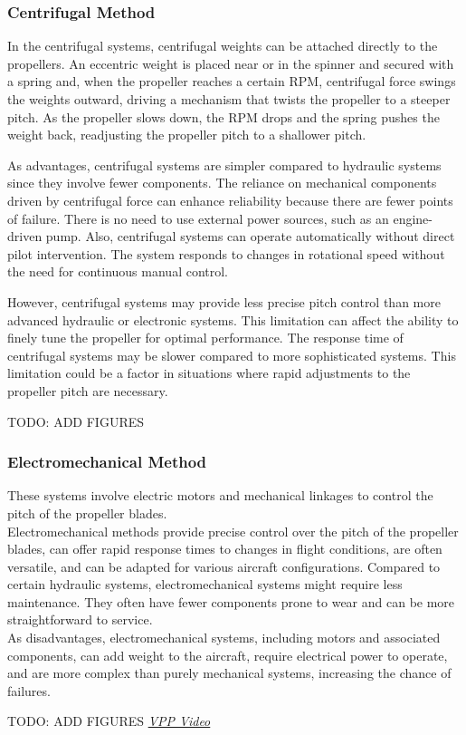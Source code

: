\subsubsection{Centrifugal Method}
In the centrifugal systems, centrifugal weights can be attached directly to the propellers.
An eccentric weight is placed near or in the spinner and secured with a spring and, when the propeller reaches a certain \gls{RPM}, centrifugal force swings the weights outward, driving a mechanism that twists the propeller to a steeper pitch. 
As the propeller slows down, the \gls{RPM} drops and the spring pushes the weight back, readjusting the propeller pitch to a shallower pitch.

As advantages, centrifugal systems are simpler compared to hydraulic systems since they involve fewer components.
The reliance on mechanical components driven by centrifugal force can enhance reliability because there are fewer points of failure.
There is no need to use external power sources, such as an engine-driven pump.
Also, centrifugal systems can operate automatically without direct pilot intervention.
The system responds to changes in rotational speed without the need for continuous manual control.

However, centrifugal systems may provide less precise pitch control than more advanced hydraulic or electronic systems. This limitation can affect the ability to finely tune the propeller for optimal performance.
The response time of centrifugal systems may be slower compared to more sophisticated systems. This limitation could be a factor in situations where rapid adjustments to the propeller pitch are necessary.\cite{VPP2}

TODO: ADD FIGURES

\subsubsection{Electromechanical Method}
These systems involve electric motors and mechanical linkages to control the pitch of the propeller blades.\\

Electromechanical methods provide precise control over the pitch of the propeller blades, can offer rapid response times to changes in flight conditions, are often versatile, and can be adapted for various aircraft configurations.
Compared to certain hydraulic systems, electromechanical systems might require less maintenance.
They often have fewer components prone to wear and can be more straightforward to service.\\

As disadvantages, electromechanical systems, including motors and associated components, can add weight to the aircraft, require electrical power to operate, and are more complex than purely mechanical systems, increasing the chance of failures.\cite{VPP2}

TODO: ADD FIGURES
\href{https://www.youtube.com/watch?v=MpsBOQOUB-4}{\textit{VPP Video}}
